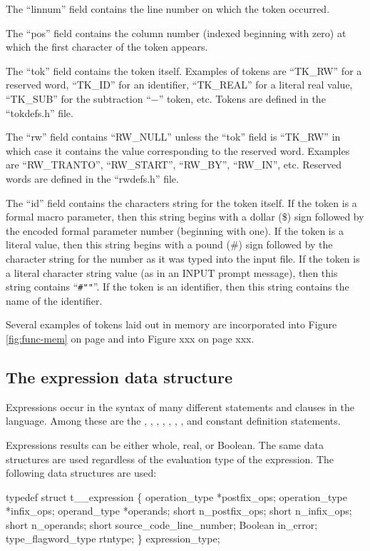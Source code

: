 The ``linnum'' field contains the line number on which the token occurred.

The ``pos'' field contains the column number (indexed beginning with zero)
at which the first character of the token appears.

The ``tok'' field contains the token itself.   Examples of tokens
are ``TK\_RW'' for a reserved word, ``TK\_ID'' for an identifier, ``TK\_REAL''
for a literal real value, ``TK\_SUB'' for the subtraction ``$-$'' token, etc.
Tokens are defined in the ``tokdefs.h'' file.

The ``rw'' field contains ``RW\_NULL'' unless the ``tok'' field is ``TK\_RW''
in which case it contains the value corresponding to the reserved word.
Examples are ``RW\_TRANTO'', ``RW\_START'', ``RW\_BY'', ``RW\_IN'', etc.
Reserved words are defined in the ``rwdefs.h'' file.

The ``id'' field contains the characters string for the token itself.  If the
token is a formal macro parameter, then this string begins with a dollar
(\$) sign followed by the encoded formal parameter number (beginning with one).
If the token is a literal value, then this string begins with a pound (\#)
sign followed by the character string for the number as it was typed into the
input file.
If the token is a literal character string value (as in an INPUT prompt
message), then this string contains ``\verb|#""|''.
If the token is an identifier, then this string contains the
name of the identifier.

Several examples of tokens laid out in memory are
incorporated into Figure \ref{fig:func-mem} on page \pageref{fig:func-mem}
and into Figure xxx on page xxx.

\subsection{The expression data structure}
\label{sec:expr}

Expressions occur in the syntax of many different statements and
clauses in the  language.
Among these are the , , ,
, , , , and constant
definition statements.

Expressions results can be either whole, real, or Boolean.   The same data
structures are used regardless of the evaluation type of the expression.
The following data structures are used:
\begin{codeexample}
typedef struct t__expression
   \{
       operation_type *postfix_ops;
       operation_type *infix_ops;
       operand_type *operands;
       short n_postfix_ops;
       short n_infix_ops;
       short n_operands;
       short source_code_line_number;
       Boolean in_error;
       type_flagword_type rtntype;
   \} expression_type;
\end{codeexample}


